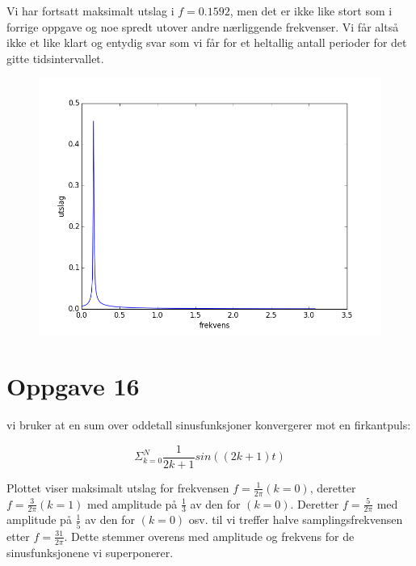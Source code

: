 \documentclass[norsk,a4paper,12pt]{article}
\begin{document}
Vi har fortsatt maksimalt utslag i $f =0.1592$, men det er ikke like stort som i forrige oppgave og noe spredt utover andre nærliggende frekvenser. Vi får altså ikke et like klart og entydig svar som vi får for et heltallig antall perioder for det gitte tidsintervallet.


\begin{figure}[H]
\includegraphics[width=15cm]{oppgave15.png}
\end{figure}


\section*{Oppgave 16}

vi bruker at en sum over oddetall sinusfunksjoner konvergerer mot en firkantpuls:

\begin{equation}
\Sigma_{k=0}^N \frac{1}{2k+1}sin((2k+1)t)
\end{equation}

Plottet viser maksimalt utslag for frekvensen $f=\frac{1}{2\pi} (k=0)$, deretter $f=\frac{3}{2\pi} (k=1)$ med amplitude på $\frac{1}{3}$ av den for $(k =0)$. Deretter $f=\frac{5}{2\pi} $ med amplitude på $\frac{1}{5}$ av den for $(k=0)$ osv. til vi treffer halve samplingsfrekvensen etter $f=\frac{31}{2\pi} $. Dette stemmer overens med amplitude og frekvens for de sinusfunksjonene vi superponerer.
\end{document}
